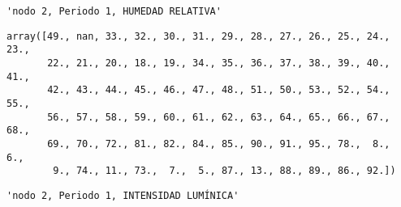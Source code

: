 \documentclass[11pt]{article}
\begin{document}
    
    
    \begin{verbatim}
'nodo 2, Periodo 1, HUMEDAD RELATIVA'
    \end{verbatim}

    
    
    \begin{verbatim}
array([49., nan, 33., 32., 30., 31., 29., 28., 27., 26., 25., 24., 23.,
       22., 21., 20., 18., 19., 34., 35., 36., 37., 38., 39., 40., 41.,
       42., 43., 44., 45., 46., 47., 48., 51., 50., 53., 52., 54., 55.,
       56., 57., 58., 59., 60., 61., 62., 63., 64., 65., 66., 67., 68.,
       69., 70., 72., 81., 82., 84., 85., 90., 91., 95., 78.,  8.,  6.,
        9., 74., 11., 73.,  7.,  5., 87., 13., 88., 89., 86., 92.])
    \end{verbatim}

    
    
    \begin{verbatim}
'nodo 2, Periodo 1, INTENSIDAD LUMÍNICA'
    \end{verbatim}

    
    
\end{document}
